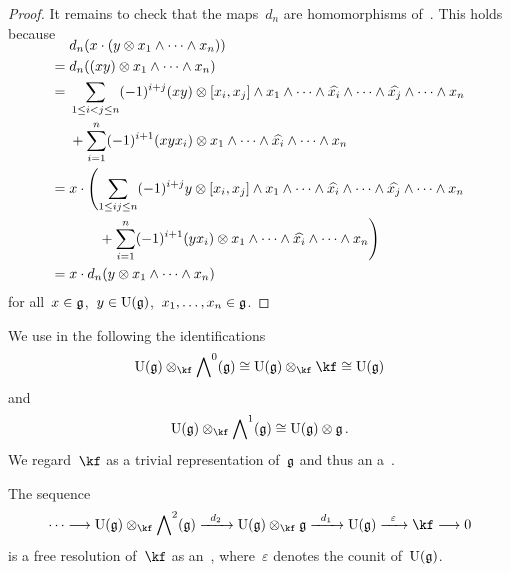 \begin{proof}
  It remains to check that the maps~$d_n$ are homomorphisms of~\modules{$\Univ(\glie)$}.
  This holds because
  \begin{align*}
    \SwapAboveDisplaySkip
    {}&
    d_n(x \cdot (y \otimes x_1 \wedge \dotsb \wedge x_n) )
    \\
    ={}&
    d_n( (xy) \otimes x_1 \wedge \dotsb \wedge x_n )
    \\
    ={}&
    \sum_{1 \leq i < j \leq n}
    (-1)^{i+j}
    (xy) \otimes [x_i, x_j] \wedge x_1 \wedge \dotsb \wedge \widehat{x_i} \wedge \dotsb \wedge \widehat{x_j} \wedge \dotsb \wedge x_n
    \\
    {}&
    +
    \sum_{i=1}^n
    (-1)^{i+1}
    (x y x_i) \otimes x_1 \wedge \dotsb \wedge \widehat{ x_i } \wedge \dotsb \wedge x_n
    \\
    ={}&
    x
    \cdot
    \Biggl(
    \sum_{1 \leq i  j \leq n}
      (-1)^{i+j}
      y \otimes [x_i, x_j] \wedge x_1 \wedge \dotsb \wedge \widehat{x_i} \wedge \dotsb \wedge \widehat{x_j} \wedge \dotsb \wedge x_n
    \\
    {}&
    \phantom{
      x \cdot
      \Biggl(
    }
      +
      \sum_{i=1}^n
      (-1)^{i+1}
      (y x_i) \otimes x_1 \wedge \dotsb \wedge \widehat{ x_i } \wedge \dotsb \wedge x_n
    \Biggr)
    \\
    ={}&
    x \cdot d_n(y \otimes x_1 \wedge \dotsb \wedge x_n)
  \end{align*}
  for all~$x \in \mathfrak{g}$,~$y \in \operatorname{U}(\mathfrak{g})$,~$x_1, \dotsc, x_n \in \mathfrak{g}$.
\end{proof}


\begin{fluff}
  We use in the following the identifications
  \[
    \Univ(\glie) \otimes_{\kf} \Exterior^0(\glie)
    \cong
    \Univ(\glie) \otimes_{\kf} \kf
    \cong
    \Univ(\glie)
  \]
  and
  \[
    \Univ(\glie) \otimes_{\kf} \Exterior^1(\glie)
    \cong
    \Univ(\glie) \otimes \glie \,.
  \]
  We regard~$\kf$ as a trivial representation of~$\mathfrak{g}$ and thus an a~\module{$\Univ(\glie)$}.
\end{fluff}


\begin{theorem}
  \label{koszul is a free resolution}
  \leavevmode
  The sequence
  \begin{equation}
    \label{koszul complex written out}
    \dotsb
    \to
    \Univ(\glie) \otimes_{\kf} \Exterior^2(\glie)
    \xto{d_2}
    \Univ(\glie) \otimes_{\kf} \glie
    \xto{d_1}
    \Univ(\glie)
    \xto{\varepsilon}
    \kf
    \to
    0
  \end{equation}
  is a free resolution of~$\kf$ as an~\module{$\Univ(\glie)$}, where~$\varepsilon$ denotes the counit of~$\Univ(\glie)$.
\end{theorem}


